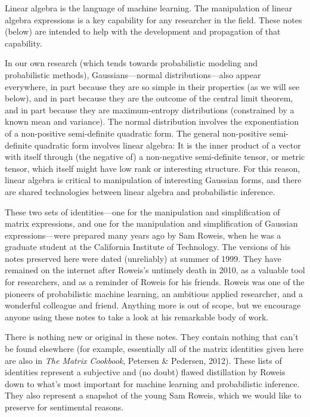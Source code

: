 \documentclass[12pt]{article}
\begin{document}
Linear algebra is the language of machine learning.
The manipulation of linear algebra expressions is a key capability for
any researcher in the field.
These notes (below) are intended to help with the development and
propagation of that capability.

In our own research (which tends towards probabilistic modeling and
probabilistic methods), Gaussians---normal distributions---also appear
everywhere, in part because they are so simple in their properties
(as we will see below), and in part because
they are the outcome of the central limit theorem, and in part
because they are maximum-entropy distributions (constrained by
a known mean and variance).
The normal distribution involves the exponentiation of a
non-positive semi-definite quadratic form.
The general non-positive semi-definite quadratic form involves linear
algebra:
It is the inner product of a vector with itself through (the negative
of) a non-negative semi-definite tensor, or metric tensor, which
itself might have low rank or interesting structure.
For this reason, linear algebra is critical to manipulation of
interesting Gaussian forms, and there are shared technologies between
linear algebra and probabilistic inference.

These two sets of identities---one for the manipulation and
simplification of matrix expressions, and one for the manipulation and
simplification of Gaussian expressions---were prepared many years ago
by Sam Roweis, when he was a graduate
student at the California Institute of Technology.
The versions of his notes preserved here were dated (unreliably) at summer
of 1999.
They have remained on the internet after Roweis's untimely death in 2010,
as a valuable tool for researchers, and as a reminder of Roweis for his
friends.
Roweis was one of the pioneers of probabilistic machine learning, an ambitious
applied researcher, and a wonderful colleague and friend.
Anything more is out of scope, but we encourage anyone using these notes to
take a look at his remarkable body of work.

There is nothing new or original in these notes.
They contain nothing that can't be found elsewhere (for example,
essentially all of the matrix identities given here are also in
\textit{The Matrix Cookbook}, Petersen \& Pedersen, 2012).
These lists of identities represent a subjective and (no doubt) flawed
distillation by Roweis down to what's most important for machine
learning and probabilistic inference.
They also represent a snapshot of the young Sam Roweis, which we would
like to preserve for sentimental reasons.
\end{document}
